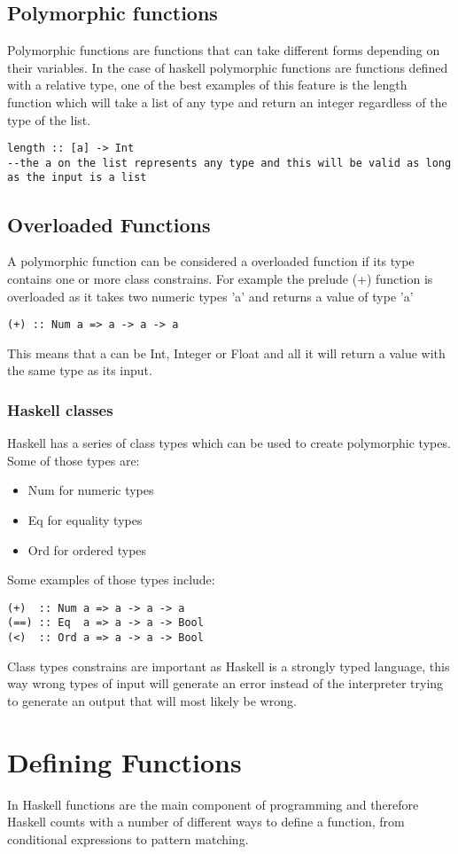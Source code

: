 \documentclass[12pt, oneside]{article}
\begin{document}
\subsection{Polymorphic functions}
Polymorphic functions are functions that can take different forms depending on their variables. In the case of haskell polymorphic functions are functions defined with a relative type, one of the best examples of this feature is the length function which will take a list of any type and return an integer regardless of the type of the list.
\begin{lstlisting}
length :: [a] -> Int
--the a on the list represents any type and this will be valid as long as the input is a list
\end{lstlisting}
\subsection{Overloaded Functions}
A polymorphic function can be considered a overloaded function if its type contains one or more class constrains. For example the prelude (+) function is overloaded as it takes two numeric types 'a' and returns a value of type 'a'
\begin{lstlisting}
(+) :: Num a => a -> a -> a
\end{lstlisting}
This means that a can be Int, Integer or Float and all it will return a value with the same type as its input.
\subsubsection{Haskell classes}
Haskell has a series of class types which can be used to create polymorphic types. Some of those types are:
\begin{itemize}
    \item{Num for numeric types}
    \item{Eq for equality types}
    \item{Ord for ordered types}
\end{itemize}
Some examples of those types include:
\begin{lstlisting}
(+)  :: Num a => a -> a -> a
(==) :: Eq  a => a -> a -> Bool
(<)  :: Ord a => a -> a -> Bool
\end{lstlisting}
Class types constrains are important as Haskell is a strongly typed language, this way wrong types of input will generate an error instead of the interpreter trying to generate an output that will most likely be wrong.

\section{Defining Functions}
In Haskell functions are the main component of programming and therefore Haskell counts with a number of different ways to define a function, from conditional expressions to pattern matching.
\end{document}
